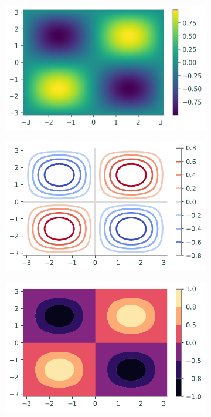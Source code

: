 \begin{figure}[H] %
\captionsetup[subfigure]{justification=centering}
\centering
\begin{framed}
\begin{subfigure}{.33\textwidth}
    \centering
    \includegraphics[width=\linewidth]{figures/heatmap.png}
\end{subfigure}%
\begin{subfigure}{.33\textwidth}
    \centering
    \includegraphics[width=\linewidth]{figures/contour.pdf}
\end{subfigure}%
\begin{subfigure}{.33\textwidth}
    \centering
    \includegraphics[width=\linewidth]{figures/contourf.pdf}
\end{subfigure}
\end{framed}
\end{figure}

